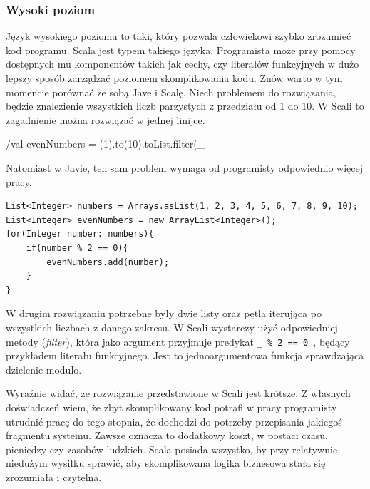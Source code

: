 \documentclass[brudnopis]{xmgr}
\begin{document}
\inputminted[fontsize=\small,label=Person.java,frame=single,framerule=0pt,framesep=2pt]{java}{code/person.java}

\inputminted[fontsize=\small,label=Person.scala,frame=single,framerule=0pt,framesep=2pt]{scala}{code/person.scala}

\subsubsection{Wysoki poziom}

Język wysokiego poziomu to taki, który pozwala człowiekowi szybko zrozumieć kod programu. Scala jest typem takiego języka. Programista może przy pomocy dostępnych mu komponentów takich jak cechy, czy literałów funkcyjnych w dużo lepszy sposób zarządzać poziomem skomplikowania kodu. Znów warto w tym momencie porównać ze sobą Jave i Scalę. Niech problemem do rozwiązania, będzie znalezienie wszystkich liczb parzystych z przedziału od 1 do 10. W Scali to zagadnienie można rozwiązać w jednej linijce.

/val evenNumbers = (1).to(10).toList.filter(_ %

Natomiast w Javie, ten sam problem wymaga od programisty odpowiednio więcej pracy.

\begin{verbatim}
List<Integer> numbers = Arrays.asList(1, 2, 3, 4, 5, 6, 7, 8, 9, 10);
List<Integer> evenNumbers = new ArrayList<Integer>();
for(Integer number: numbers){
    if(number % 2 == 0){
        evenNumbers.add(number);
    }
}
\end{verbatim}

W drugim rozwiązaniu potrzebne były dwie listy oraz pętla iterująca po wszystkich liczbach z danego zakresu. W Scali wystarczy użyć odpowiedniej metody (\emph{filter}), która jako argument przyjmuje predykat \texttt{\_ \% 2 == 0 }, będący przykładem literału funkcyjnego. Jest to jednoargumentowa funkcja sprawdzająca dzielenie modulo.

Wyraźnie widać, że rozwiązanie przedstawione w Scali jest krótsze. Z własnych doświadczeń wiem, że zbyt skomplikowany kod potrafi w pracy programisty utrudnić pracę do tego stopnia, że dochodzi do potrzeby przepisania jakiegoś fragmentu systemu. Zawsze oznacza to dodatkowy koszt, w postaci czasu, pieniędzy czy zasobów ludzkich. Scala posiada wszystko, by przy relatywnie niedużym wysiłku sprawić, aby skomplikowana logika biznesowa stała się zrozumiała i czytelna.
\end{document}
